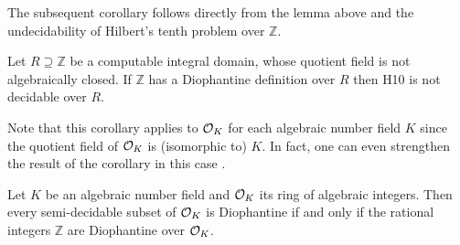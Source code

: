 The subsequent corollary follows directly from the lemma above and the
undecidability of Hilbert's tenth problem over $ℤ$.

\begin{cor}
  Let $R \supseteq ℤ$ be a computable integral domain, whose quotient field is
  not algebraically closed. If $ℤ$ has a Diophantine definition over $R$ then
  \textsc{H10} is not decidable over $R$.
\end{cor}

Note that this corollary applies to $\mathcal{O}_{K}$ for each algebraic number field
$K$ since the quotient field of $\mathcal{O}_{K}$ is (isomorphic to) $K$. In fact, one
can even strengthen the result of the corollary in this case \cite[cf.][§~11]{Davis1976}.

\begin{thm}\label{thm:CE sets are Diophantine}
  Let \(K\) be an algebraic number field and \(\mathcal{O}_{K}\) its ring of
  algebraic integers. Then every semi-decidable subset of \(\mathcal{O}_{K}\) is
  Diophantine if and only if the rational integers \(ℤ\) are Diophantine over
  \(\mathcal{O}_{K}\).
\end{thm}
